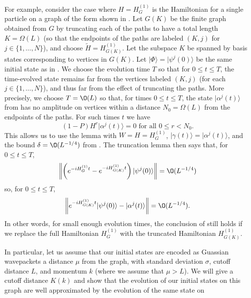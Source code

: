 \documentclass[../thesis-main/thesis-main]{subfiles}
\begin{document}
For example, consider the case where $H=H_G^{(1)}$ is the Hamiltonian  for a single particle on a graph of the form shown in . Let $G(K)$ be the finite graph obtained from $G$ by truncating each of the paths to have a total length $K=\Omega(L)$ (so that the endpoints of the paths are labeled $(K,j)$ for $j\in\{1,\ldots,N\}$), and choose $\tilde{H}=H_{G(K)}^{(1)}$. Let the subspace $K$ be spanned by basis states corresponding to vertices in $G(K)$.  Let $|\Phi\rangle=|\psi^j(0)\rangle$ be the same initial state as in . We choose the evolution time $T$ so that for $0\leq t\leq T$, the time-evolved state remains far from the vertices labeled $(K,j)$ (for each $j\in\{1,\ldots,N\}$), and thus far from the effect of truncating the paths.  More precisely, we choose $T=\O(L)$ so that, for times $0\leq t\leq T$, the state $|\alpha^j (t)\rangle$ from  has no amplitude on vertices within a distance $N_0=\Omega(L)$ from the endpoints of the paths. For such times $t$ we have
\[
\left(1-P\right)H^r |\alpha^j \left(t\right)\rangle=0 \text{ for all } 0\leq  r < N_0.
\]
This allows us to use the lemma with $W=H=H_G^{(1)}$, $|\gamma(t)\rangle=|\alpha^j(t)\rangle$, and the bound $\delta=\O(L^{-{1}/{4}})$ from . The truncation lemma then says that, for $0\leq t\leq T$,
\begin{equation}
\left\Vert \left(e^{-iH_{G}^{(1)}t}-e^{-iH_{G(K)}^{(1)}t}\right)|\psi^{j}(0)\rangle \right\Vert=\O(L^{-{1}/{4}})
\label{eq:trunc_paths}
\end{equation}
so, for $0\leq t\leq T$,
\[
\left\Vert e^{-iH_{G(K)}^{(1)}t}|\psi^{j}(0)\rangle-|\alpha^{j}(t)\rangle \right\Vert =\O(L^{-{1}/{4}}).
\]
In other words, for small enough evolution times, the conclusion of  still holds if we replace the full Hamiltonian $H^{(1)}_G$ with the truncated Hamiltonian $H_{G(K)}^{(1)}$.

In particular, let us assume that our initial states are encoded as Guassian wavepackets a distance $\mu$ from the graph, with standard deviation $\sigma$, cutoff distance $L$, and momentum $k$ (where we assume that $\mu > L$).  We will give a cutoff distance $K(k)$ and show that the evolution of our initial states on this graph are well approximated by the evolution of the same state on 

\end{document}
